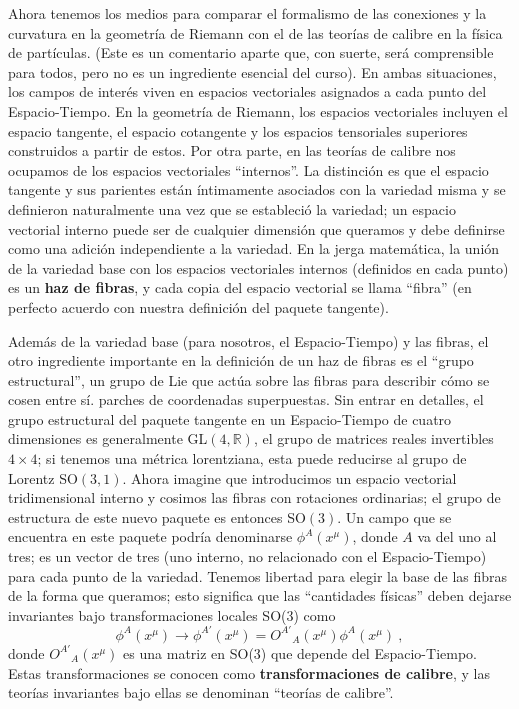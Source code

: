 \documentclass[11pt,b5paper,openany,twoside]{book}
\newcommand{\R}{\mathbb{R}}
\begin{document}
Ahora tenemos los medios para comparar el formalismo de las conexiones y la curvatura en la geometría de Riemann con el de las teorías de calibre en la física de partículas.
(Este es un comentario aparte que, con suerte, será comprensible para todos, pero no es un ingrediente esencial del curso).
En ambas situaciones, los campos de interés viven en espacios vectoriales asignados a cada punto del Espacio-Tiempo.
En la geometría de Riemann, los espacios vectoriales incluyen el espacio tangente, el espacio cotangente y los espacios tensoriales superiores construidos a partir de estos.
Por otra parte, en las teorías de calibre nos ocupamos de los espacios vectoriales ``internos''.
La distinción es que el espacio tangente y sus parientes están íntimamente asociados con la variedad misma y se definieron naturalmente una vez que se estableció la variedad; un espacio vectorial interno puede ser de cualquier dimensión que queramos y debe definirse como una adición independiente a la variedad.
En la jerga matemática, la unión de la variedad base con los espacios vectoriales internos (definidos en cada punto) es un {\bf haz de fibras}, y cada copia del espacio vectorial se llama ``fibra'' (en perfecto acuerdo con nuestra definición del paquete tangente).

Además de la variedad base (para nosotros, el Espacio-Tiempo) y las fibras, el otro ingrediente importante en la definición de un haz de fibras es el ``grupo estructural'', un grupo de Lie que actúa sobre las fibras para describir cómo se cosen entre sí. parches de coordenadas superpuestas.
Sin entrar en detalles, el grupo estructural del paquete tangente en un Espacio-Tiempo de cuatro dimensiones es generalmente GL$(4,\R)$, el grupo de matrices reales invertibles $4\times 4$; si tenemos una métrica lorentziana, esta puede reducirse al grupo de Lorentz SO$(3,1)$.
Ahora imagine que introducimos un espacio vectorial tridimensional interno y cosimos las fibras con rotaciones ordinarias; el grupo de estructura de este nuevo paquete es entonces SO$(3)$.
Un campo que se encuentra en este paquete podría denominarse $\phi^A(x^\mu)$, donde $A$ va del uno al tres; es un vector de tres (uno interno, no relacionado con el Espacio-Tiempo) para cada punto de la variedad.
Tenemos libertad para elegir la base de las fibras de la forma que queramos; esto significa que las ``cantidades físicas'' deben dejarse invariantes bajo transformaciones locales SO(3) como
\begin{equation}
\phi^A(x^\mu)\rightarrow \phi^{A'}(x^\mu)=
O^{A'}{}_A(x^\mu)\phi^A(x^\mu)\ ,\label{3.145}
\end{equation}
donde $O^{A'}{}_A(x^\mu)$ es una matriz en SO(3) que depende del Espacio-Tiempo.
Estas transformaciones se conocen como {\bf transformaciones de calibre}, y las teorías invariantes bajo ellas se denominan ``teorías de calibre''.
\end{document}
